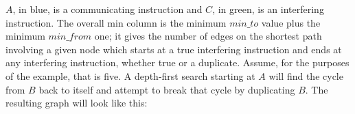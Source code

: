 

$A$, in blue, is a communicating instruction and $C$, in green, is an
interfering instruction.  The overall min column is the minimum
$\mathit{min\_to}$ value plus the minimum $\mathit{min\_from}$ one; it
gives the number of edges on the shortest path involving a given node
which starts at a true interfering instruction and ends at any
interfering instruction, whether true or a duplicate.  Assume, for the
purposes of the example, that \backref{$\alpha$} is five.  A
depth-first search starting at $A$ will find the cycle from $B$ back
to itself and attempt to break that cycle by duplicating $B$.  The
resulting graph will look like this:

